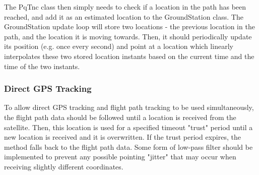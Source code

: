The PqTnc class then simply needs to check if a location in the path has been reached, and add it as an estimated location to the GroundStation class. The GroundStation update loop will store two locations - the previous location in the path, and the location it is moving towards. Then, it should periodically update its position (e.g. once every second) and point at a location which linearly interpolates these two stored location instants based on the current time and the time of the two instants.


\subsubsection{Direct GPS Tracking}
To allow direct GPS tracking and flight path tracking to be used simultaneously, the flight path data should be followed until a location is received from the satellite. Then, this location is used for a specified timeout "trust" period until a new location is received and it is overwritten. If the trust period expires, the method falls back to the flight path data. Some form of low-pass filter should be implemented to prevent any possible pointing "jitter" that may occur when receiving slightly different coordinates.